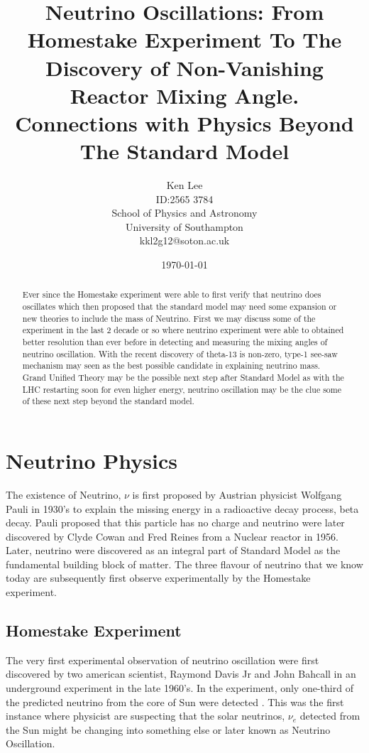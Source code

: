 \documentclass[11pt ,a4paper]{article}
\begin{document}
 
\title{Neutrino Oscillations: From Homestake Experiment To The Discovery of Non-Vanishing Reactor Mixing Angle. Connections with Physics Beyond The Standard Model}
\author{Ken Lee\\ ID:2565 3784\\ School of Physics and Astronomy\\ University of Southampton\\ kkl2g12@soton.ac.uk}
\date{\today}
\maketitle
\begin{abstract}
Ever since the Homestake experiment were able to first verify that neutrino does oscillates which then proposed that the standard model may need some expansion or new theories to include the mass of Neutrino. First we may discuss some of the experiment in the last 2 decade or so where neutrino experiment were able to obtained better resolution than ever before in detecting and measuring the mixing angles of neutrino oscillation. With the recent discovery of theta-13 is non-zero, type-1 see-saw mechanism may seen as the best possible candidate in explaining neutrino mass. Grand Unified Theory may be the possible next step after Standard Model as with the LHC restarting soon for even higher energy, neutrino oscillation may be the clue some of these next step beyond the standard model.
\end{abstract}
\section*{Neutrino Physics}
The existence of Neutrino, \(\nu \) is first proposed by Austrian physicist Wolfgang Pauli in 1930's to explain the missing energy in a radioactive decay process, beta decay. Pauli proposed that this particle has no charge and neutrino were later discovered by Clyde Cowan and Fred Reines from a Nuclear reactor in 1956.\cite{king07} Later, neutrino were discovered as an integral part of Standard Model as the fundamental building block of matter. The three flavour of neutrino that we know today are subsequently first observe experimentally by the Homestake experiment.
\subsection*{Homestake Experiment}
The very first experimental observation of neutrino oscillation were first discovered by two american scientist, Raymond Davis Jr and John Bahcall in an underground experiment in the late 1960's. In the experiment, only one-third of the predicted neutrino from the core of Sun were detected \cite{king07}. This was the first instance where physicist are suspecting that the solar neutrinos, \(\nu_e \) detected from the Sun might be changing into something else or later known as Neutrino Oscillation.
\end{document}
